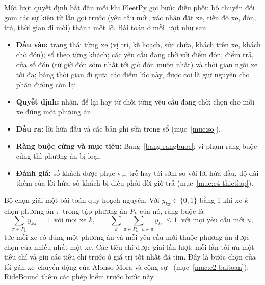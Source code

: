 Một lượt quyết định bắt đầu mỗi khi FleetPy gọi bước điều phối: bộ chuyển đổi gom các sự kiện từ lần gọi
trước (yêu cầu mới, xác nhận đặt xe, tiến độ xe, đón, trả, thời gian đi mới) thành một lô. Bài toán ở mỗi
lượt như sau.
\begin{itemize}[leftmargin=1.2cm,itemsep=2pt,topsep=3pt]
\item \textbf{Đầu vào:} trạng thái từng xe (vị trí, kế hoạch, sức chứa, khách trên xe, khách chờ đón); sổ
theo từng khách; các yêu cầu đang chờ với điểm đón, điểm trả, cửa sổ đón (từ giờ đón sớm nhất tới giờ đón
muộn nhất) và thời gian ngồi xe tối đa; bảng thời gian đi giữa các điểm lúc này, được coi là giữ nguyên cho
phần đường còn lại.
\item \textbf{Quyết định:} nhận, để lại hay từ chối từng yêu cầu đang chờ; chọn cho mỗi xe đúng một phương án.
\item \textbf{Đầu ra:} lời hứa đầu và các bản ghi sửa trong sổ (mục~\ref{muc:so}).
\item \textbf{Ràng buộc cứng và mục tiêu:} Bảng~\ref{bang:rangbuoc}; vi phạm ràng buộc cứng thì phương án bị
loại.
\item \textbf{Đánh giá:} số khách được phục vụ, trễ hay tới sớm so với lời hứa đầu, độ dài thêm của lời hứa,
số khách bị điều phối dời giờ trả (mục~\ref{muc:c4-thietlap}).
\end{itemize}

Bộ chọn giải một bài toán quy hoạch nguyên. Với $y_{k\pi} \in \{0, 1\}$ bằng 1 khi xe $k$ chọn phương án
$\pi$ trong tập phương án $P_k$ của nó, ràng buộc là
\begin{equation}
\sum_{\pi \in P_k} y_{k\pi} = 1 \;\;\text{với mọi xe } k, \qquad
\sum_{k} \sum_{\pi \in P_k,\; u \in \pi} y_{k\pi} \le 1 \;\;\text{với mọi yêu cầu mới } u ,
\label{eq:chon}
\end{equation}
tức mỗi xe có đúng một phương án và mỗi yêu cầu mới thuộc phương án được chọn của nhiều nhất một xe. Các
tiêu chí được giải lần lượt: mỗi lần tối ưu một tiêu chí và giữ các tiêu chí trước ở giá trị tốt nhất đã
tìm. Đây là bước chọn của lối gán xe--chuyến động của Alonso-Mora và cộng sự~\cite{alonsomora2017}
(mục~\ref{muc:c2-baitoan}); RideBound thêm các phép kiểm trước bước này.

